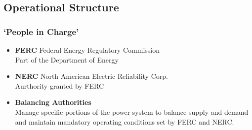 \documentclass[14pt, unknownkeysallowed]{beamer}
\begin{document}
\subsection{Operational Structure}
\begin{frame}
\frametitle{`People in Charge'}
\begin{itemize}
\item \textbf{FERC}{ \footnotesize Federal Energy Regulatory Commission}\\
 Part of the Department of Energy
\item \textbf{NERC}{ \footnotesize
 North American Electric Reliability Corp.}\\
 Aurthority granted by FERC
 \item \textbf{Balancing Authorities} \\
 Manage specific portions of the power system to balance supply and demand and maintain mandatory operating conditions set by FERC and NERC. %
\end{itemize}
\end{frame}
\end{document}
